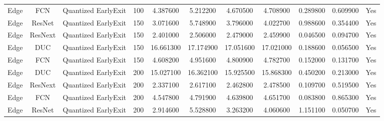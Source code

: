 \begin{tabular}{|c||c||c||c||c||c||c||c||c||c||c|}
Edge & FCN & Quantized EarlyExit & 100 & 4.387600 & 5.212200 & 4.670500 & 4.708900 & 0.289800 & 0.609900 & Yes \\
Edge & ResNet & Quantized EarlyExit & 150 & 3.071600 & 5.748900 & 3.796000 & 4.022700 & 0.988600 & 0.354400 & Yes \\
Edge & ResNext & Quantized EarlyExit & 150 & 2.401000 & 2.506000 & 2.479000 & 2.459900 & 0.046500 & 0.094700 & Yes \\
Edge & DUC & Quantized EarlyExit & 150 & 16.661300 & 17.174900 & 17.051600 & 17.021000 & 0.188600 & 0.056500 & Yes \\
Edge & FCN & Quantized EarlyExit & 150 & 4.608200 & 4.951600 & 4.800900 & 4.782700 & 0.152000 & 0.131700 & Yes \\
Edge & DUC & Quantized EarlyExit & 200 & 15.027100 & 16.362100 & 15.925500 & 15.868300 & 0.450200 & 0.213000 & Yes \\
Edge & ResNext & Quantized EarlyExit & 200 & 2.337100 & 2.617100 & 2.462800 & 2.478500 & 0.109700 & 0.519500 & Yes \\
Edge & FCN & Quantized EarlyExit & 200 & 4.547800 & 4.791900 & 4.639800 & 4.651700 & 0.083800 & 0.865300 & Yes \\
Edge & ResNet & Quantized EarlyExit & 200 & 2.914600 & 5.528800 & 3.263200 & 4.060600 & 1.151100 & 0.050700 & Yes \\
\bottomrule
\end{tabular}
